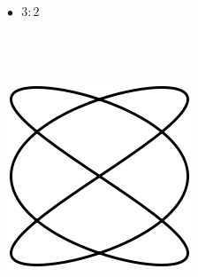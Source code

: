 \documentclass[a4paper,12pt]{article} %
\begin{document}
$\bullet \text{ }3:2$\\\\\\\\\newline
\begin{center}
\includegraphics{23}
\end{center}
\end{document}
